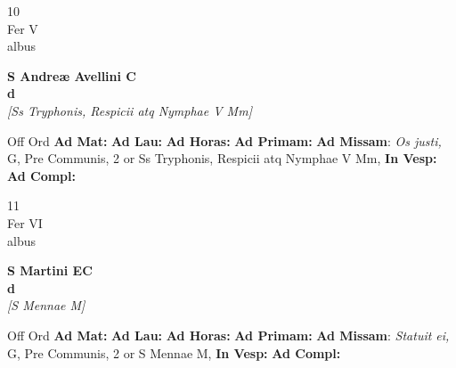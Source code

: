 \documentclass[10pt, openany]{book}
\begin{document}
        \begin{center}
            \begin{minipage}{3.5in}
                \vspace{2em}
                \begin{minipage}{0.5in}
                    {\Huge 10} \\
                    {\normalsize Fer V} \\
                    {\normalsize albus}
                \end{minipage}
                \begin{minipage}{3.0in}
                    \textbf{ \large S Andreæ Avellini C \\
                    \textnormal{\normalsize d}} \\ \textit{[Ss Tryphonis, Respicii atq Nymphae V Mm]} \\ 
                \end{minipage}
                \begin{justify}Off Ord
                    \textbf{Ad Mat: }
                    \textbf{Ad Lau: }
                    \textbf{Ad Horas: }
                    \textbf{Ad Primam: }\textbf{Ad Missam}: \textit{Os justi,} G, Pre Communis, 2 or Ss Tryphonis, Respicii atq Nymphae V Mm,  
                    \textbf{In Vesp: }
                    \textbf{Ad Compl: }
                \end{justify}
            \end{minipage}
        \end{center}
    
        \begin{center}
            \begin{minipage}{3.5in}
                \vspace{2em}
                \begin{minipage}{0.5in}
                    {\Huge 11} \\
                    {\normalsize Fer VI} \\
                    {\normalsize albus}
                \end{minipage}
                \begin{minipage}{3.0in}
                    \textbf{ \large S Martini EC \\
                    \textnormal{\normalsize d}} \\ \textit{[S Mennae M]} \\ 
                \end{minipage}
                \begin{justify}Off Ord
                    \textbf{Ad Mat: }
                    \textbf{Ad Lau: }
                    \textbf{Ad Horas: }
                    \textbf{Ad Primam: }\textbf{Ad Missam}: \textit{Statuit ei,} G, Pre Communis, 2 or S Mennae M,  
                    \textbf{In Vesp: }
                    \textbf{Ad Compl: }
                \end{justify}
            \end{minipage}
        \end{center}
    
\end{document}
